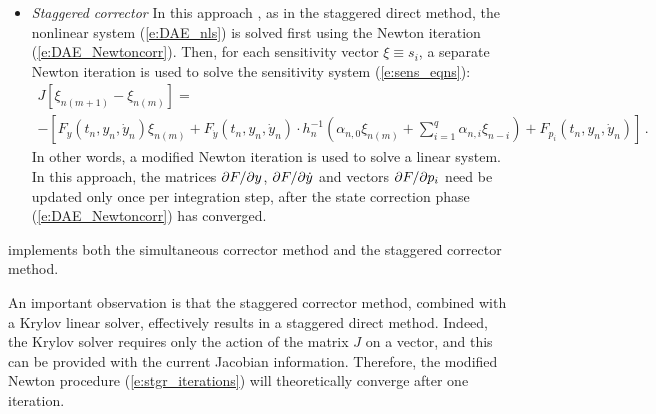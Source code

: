 \begin{itemize}
\item {\em Staggered corrector}
  In this approach \cite{FTB:97}, as in the staggered direct method,
  the nonlinear system (\ref{e:DAE_nls}) is solved first using the Newton
  iteration (\ref{e:DAE_Newtoncorr}). Then, for each sensitivity vector $\xi \equiv s_i$,
  a separate Newton iteration is used to solve the sensitivity system (\ref{e:sens_eqns}):
  \begin{multline}\label{e:stgr_iterations}
    J [\xi_{n(m+1)} - \xi_{n(m)}]= \\
    - \left[
      F_y (t_n, y_n, \dot y_n) \xi_{n(m)}
      + F_{\dot y} (t_n, y_n, \dot y_n) \cdot
      h_n^{-1} \left(
        \alpha_{n,0} \xi_{n(m)} + \sum_{i=1}^q \alpha_{n,i} \xi_{n-i}
      \right)
      + F_{p_i} (t_n, y_n, \dot y_n)
    \right] \, .
  \end{multline}
  In other words, a modified Newton iteration is used to solve a linear system.
  In this approach, the matrices $\partial F / \partial y$, $\partial F / \partial \dot y$ and vectors $\partial F / \partial p_i$ need
  be updated only once per integration step, after the state correction phase
  (\ref{e:DAE_Newtoncorr}) has converged.
\end{itemize}
{\idas} implements both the simultaneous corrector method and the staggered
corrector method.

An important observation is that the staggered corrector method, combined with
a Krylov linear solver, effectively results in a staggered direct method.
Indeed, the Krylov solver requires only the action of the matrix $J$ on a vector,
and this can be provided with the current Jacobian information. Therefore, the
modified Newton procedure (\ref{e:stgr_iterations}) will theoretically converge
after one iteration.

